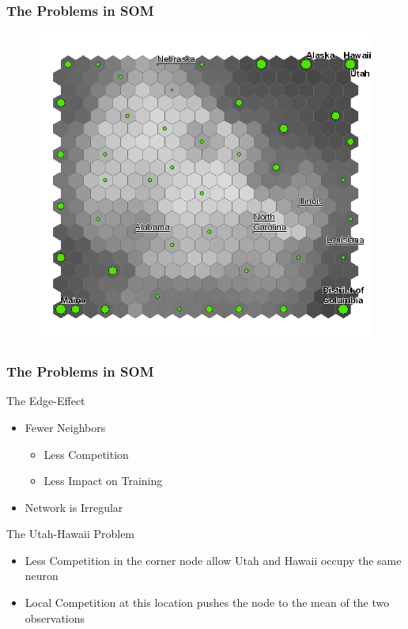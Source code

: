 \documentclass[nototal,handout]{beamer}
\begin{document}
\begin{frame}
	\frametitle{The Problems in SOM}
  \begin{center}
  \begin{figure}
  \includegraphics[width=0.60\linewidth]{states.png}
  \end{figure}
  \end{center}
 \end{frame} 

\begin{frame}
	\frametitle{The Problems in SOM}
 
\begin{block}{The Edge-Effect}
 \begin{itemize}
 \item  Fewer Neighbors
 \begin{itemize}
 \item  Less Competition
 \item  Less Impact on Training
 \end{itemize}
 \item  Network is Irregular
 \end{itemize}
 \end{block} 
\begin{block}{The Utah-Hawaii Problem}
 \begin{itemize}
 \item  Less Competition in the corner node allow Utah and Hawaii occupy the same neuron
 \item  Local Competition at this location pushes the node to the mean of the two observations
 \end{itemize}
 \end{block} \end{frame} 
\end{document}

